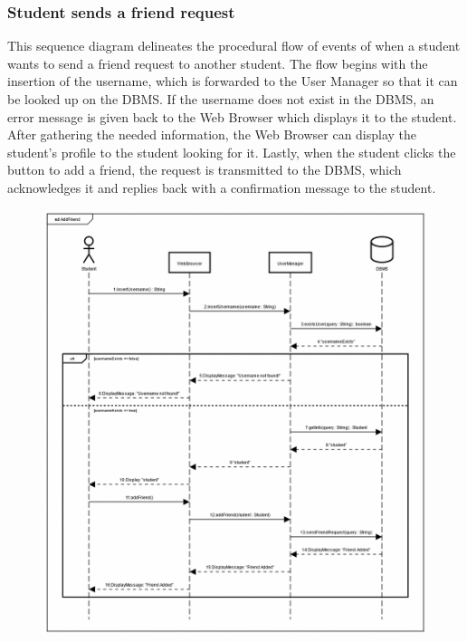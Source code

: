 \documentclass[12pt,oneside,a4paper]{article}
\begin{document}
\clearpage

\subsubsection{Student sends a friend request}
This sequence diagram delineates the procedural flow of events of when a student wants to send a friend request to another student. The flow begins with the insertion of the username, which is forwarded to the User Manager so that it can be looked up on the DBMS. If the username does not exist in the DBMS, an error message is given back to the Web Browser which displays it to the student. After gathering the needed information, the Web Browser can display the student's profile to the student looking for it. Lastly, when the student clicks the button to add a friend, the request is transmitted to the DBMS, which acknowledges it and replies back with a confirmation message to the student. 
\begin{figure}[htbp]
    \centering
    \includegraphics[width=1\linewidth]{Images/Sequence Diagrams/AddFriend.png}
    \label{fig:enter-label}
\end{figure}

\clearpage
\end{document}
